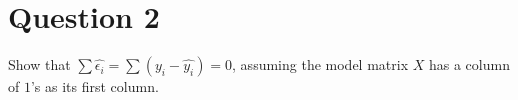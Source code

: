 \section{Question 2}

\begin{question}
    Show that $\sum{\hat{\epsilon_{i}}} = \sum{(y_i - \hat{y_i})} = 0$, assuming the model matrix $X$ has a column of $1$’s
as its first column.
\end{question}

\begin{answer}
    
\end{answer}